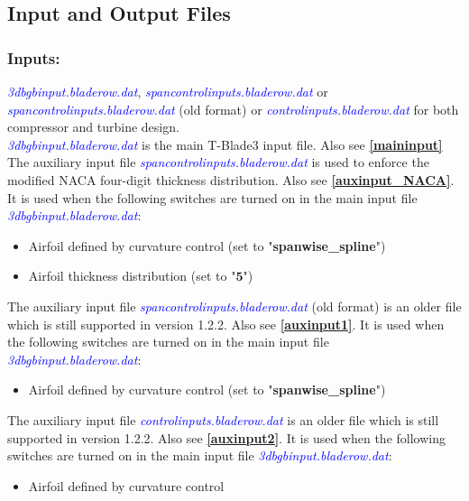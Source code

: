 \documentclass[8pt]{article}
\begin{document}
\subsection{Input and Output Files}\label{inputoutput}
\subsubsection{Inputs:}\label{inputs}
\noindent
\textit{\textcolor{blue}{3dbgbinput.bladerow.dat}}, \textit{\textcolor{blue}{spancontrolinputs.bladerow.dat}} or \textit{\textcolor{blue}{spancontrolinputs.bladerow.dat}} (old format) or \textit{\textcolor{blue}{controlinputs.bladerow.dat}} for both compressor and turbine design.\\

\noindent
\textit{\textcolor{blue}{3dbgbinput.bladerow.dat}} is the main T-Blade3 input file. Also see \textbf{\ref{maininput}}\\ 

\noindent
The auxiliary input file \textit{\textcolor{blue}{spancontrolinputs.bladerow.dat}} is used to enforce the modified NACA four-digit thickness distribution. Also see \textbf{\ref{auxinput_NACA}}. It is used when the following switches are turned on in the main input file \textit{\textcolor{blue}{3dbgbinput.bladerow.dat}}:
\begin{itemize}
    \item Airfoil defined by curvature control (set to "\textbf{spanwise\_spline}")
    \item Airfoil thickness distribution (set to "$\mathbf{5}$")
\end{itemize}

\noindent
The auxiliary input file \textit{\textcolor{blue}{spancontrolinputs.bladerow.dat}} (old format) is an older file which is still supported in version 1.2.2. Also see \textbf{\ref{auxinput1}}. It is used when the following switches are turned on in the main input file \textit{\textcolor{blue}{3dbgbinput.bladerow.dat}}:
\begin{itemize}
    \item Airfoil defined by curvature control (set to "\textbf{spanwise\_spline}")
\end{itemize}

\noindent 
The auxiliary input file \textit{\textcolor{blue}{controlinputs.bladerow.dat}} is an older file which is still supported in version 1.2.2. Also see \textbf{\ref{auxinput2}}. It is used when the following switches are turned on in the main input file \textit{\textcolor{blue}{3dbgbinput.bladerow.dat}}:
\begin{itemize}
    \item Airfoil defined by curvature control 
\end{itemize}
\end{document}
